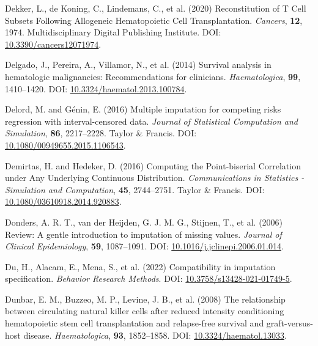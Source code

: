 \documentclass[
  letterpaper,
  paper=240mm:170mm,
  twoside=true,
  open=right,
  fontsize=10pt,
  pagesize=false,
  BCOR=15mm,
  DIV=14,
  headinclude=true,
  footinclude=false,
  headsepline=on]{scrbook}
\newlength{\cslhangindent}
\newenvironment{CSLReferences}[2] %
 {\begin{list}{}{%
  \setlength{\itemindent}{0pt}
  \setlength{\leftmargin}{0pt}
  \setlength{\parsep}{0pt}
  \ifodd #1
   \setlength{\leftmargin}{\cslhangindent}
   \setlength{\itemindent}{-1\cslhangindent}
  \fi
  \setlength{\itemsep}{#2\baselineskip}}}
 {\end{list}}
\begin{document}
\begin{CSLReferences}{1}{1}
Dekker, L., de Koning, C., Lindemans, C., et al. (2020) Reconstitution
of {T Cell Subsets Following Allogeneic Hematopoietic Cell
Transplantation}. \emph{Cancers}, \textbf{12}, 1974. Multidisciplinary
Digital Publishing Institute. DOI:
\href{https://doi.org/10.3390/cancers12071974}{10.3390/cancers12071974}.

Delgado, J., Pereira, A., Villamor, N., et al. (2014) Survival analysis
in hematologic malignancies: Recommendations for clinicians.
\emph{Haematologica}, \textbf{99}, 1410--1420. DOI:
\href{https://doi.org/10.3324/haematol.2013.100784}{10.3324/haematol.2013.100784}.

Delord, M. and Génin, E. (2016) Multiple imputation for competing risks
regression with interval-censored data. \emph{Journal of Statistical
Computation and Simulation}, \textbf{86}, 2217--2228. Taylor \& Francis.
DOI:
\href{https://doi.org/10.1080/00949655.2015.1106543}{10.1080/00949655.2015.1106543}.

Demirtas, H. and Hedeker, D. (2016) Computing the {Point-biserial
Correlation} under {Any Underlying Continuous Distribution}.
\emph{Communications in Statistics - Simulation and Computation},
\textbf{45}, 2744--2751. Taylor \& Francis. DOI:
\href{https://doi.org/10.1080/03610918.2014.920883}{10.1080/03610918.2014.920883}.

Donders, A. R. T., van der Heijden, G. J. M. G., Stijnen, T., et al.
(2006) Review: {A} gentle introduction to imputation of missing values.
\emph{Journal of Clinical Epidemiology}, \textbf{59}, 1087--1091. DOI:
\href{https://doi.org/10.1016/j.jclinepi.2006.01.014}{10.1016/j.jclinepi.2006.01.014}.

Du, H., Alacam, E., Mena, S., et al. (2022) Compatibility in imputation
specification. \emph{Behavior Research Methods}. DOI:
\href{https://doi.org/10.3758/s13428-021-01749-5}{10.3758/s13428-021-01749-5}.

Dunbar, E. M., Buzzeo, M. P., Levine, J. B., et al. (2008) The
relationship between circulating natural killer cells after reduced
intensity conditioning hematopoietic stem cell transplantation and
relapse-free survival and graft-versus-host disease.
\emph{Haematologica}, \textbf{93}, 1852--1858. DOI:
\href{https://doi.org/10.3324/haematol.13033}{10.3324/haematol.13033}.


\end{CSLReferences}
\end{document}
